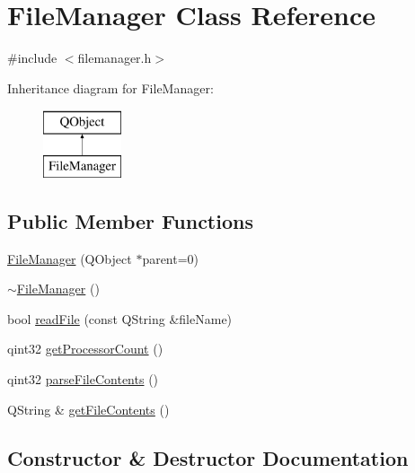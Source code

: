 \hypertarget{class_file_manager}{}\section{File\+Manager Class Reference}
\label{class_file_manager}


{\ttfamily \#include $<$filemanager.\+h$>$}

Inheritance diagram for File\+Manager\+:\begin{figure}[H]
\begin{center}
\leavevmode
\includegraphics[height=2.000000cm]{class_file_manager}
\end{center}
\end{figure}
\subsection*{Public Member Functions}
\begin{DoxyCompactItemize}
\item 
\hyperlink{class_file_manager_aed06615dba6e3987ba4f129505e92edc}{File\+Manager} (Q\+Object $\ast$parent=0)
\item 
\hyperlink{class_file_manager_abaed33b5b0c13b8a597db9335a1aacfa}{$\sim$\+File\+Manager} ()
\item 
bool \hyperlink{class_file_manager_ac2f59a9eab9545d803729fd73438ff13}{read\+File} (const Q\+String \&file\+Name)
\item 
qint32 \hyperlink{class_file_manager_a152e84aab081c06a53abde7023ee341f}{get\+Processor\+Count} ()
\item 
qint32 \hyperlink{class_file_manager_a7bbda9c89953f666440a1550adf4bb2f}{parse\+File\+Contents} ()
\item 
Q\+String \& \hyperlink{class_file_manager_af6c82e156919875fb1bfbf3b6fc56c96}{get\+File\+Contents} ()
\end{DoxyCompactItemize}


\subsection{Constructor \& Destructor Documentation}
\mbox{\label{class_file_manager_aed06615dba6e3987ba4f129505e92edc}} 
